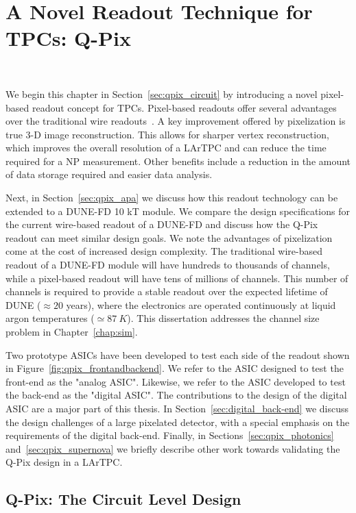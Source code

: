 \chapter{A Novel Readout Technique for TPCs: Q-Pix}~\label{chap:qpix}

We begin this chapter in Section~\ref{sec:qpix_circuit} by introducing a novel pixel-based readout concept for TPCs.
Pixel-based readouts offer several advantages over the traditional wire readouts~\citep{lartpc_recon_problems_joshi_2015}.
A key improvement offered by pixelization is true 3-D image reconstruction.
This allows for sharper vertex reconstruction, which improves the overall resolution of a LArTPC and can reduce the time required for a NP measurement.
Other benefits include a reduction in the amount of data storage required and easier data analysis.

Next, in Section~\ref{sec:qpix_apa} we discuss how this readout technology can be extended to a DUNE-FD 10 kT module.
We compare the design specifications for the current wire-based readout of a DUNE-FD and discuss how the Q-Pix readout can meet similar design goals.
We note the advantages of pixelization come at the cost of increased design complexity.
The traditional wire-based readout of a DUNE-FD module will have hundreds to thousands of channels, while a pixel-based readout will have tens of millions of channels.
This number of channels is required to provide a stable readout over the expected lifetime of DUNE ($\approx 20$ years), where the electronics are operated continuously at liquid argon temperatures ($\simeq 87~\unit{K}$).
This dissertation addresses the channel size problem in Chapter~\ref{chap:sim}.

Two prototype ASICs have been developed to test each side of the readout shown in Figure~\ref{fig:qpix_frontandbackend}.
We refer to the ASIC designed to test the front-end as the "analog ASIC".
Likewise, we refer to the ASIC developed to test the back-end as the "digital ASIC".
The contributions to the design of the digital ASIC are a major part of this thesis.
In Section~\ref{sec:digital_back-end} we discuss the design challenges of a large pixelated detector, with a special emphasis on the requirements of the digital back-end.
Finally, in Sections~\ref{sec:qpix_photonics} and~\ref{sec:qpix_supernova} we briefly describe other work towards validating the Q-Pix design in a LArTPC.

\section{Q-Pix: The Circuit Level Design}~\label{sec:qpix_circuit}

